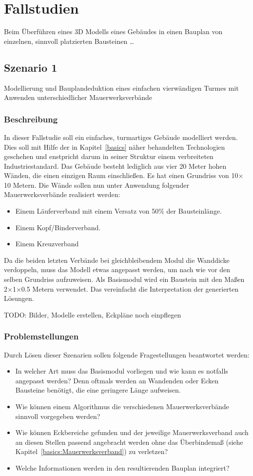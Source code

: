 \chapter{Fallstudien}\label{scenarios}
Beim Überführen eines 3D Modells eines Gebäudes in einen Bauplan von einzelnen, sinnvoll platzierten Bausteinen \dots
\section{Szenario 1}\label{scenarios:scenario1}
Modellierung und Bauplandeduktion eines einfachen vierwändigen Turmes mit Anwenden unterschiedlicher Mauerwerksverbände
\subsection*{Beschreibung}
In dieser Fallstudie soll ein einfaches, turmartiges Gebäude modelliert werden.
Dies soll mit Hilfe der in Kapitel~\ref{basics} näher behandelten Technologien geschehen und enstpricht darum in seiner Struktur einem verbreiteten Industriestandard.
Das Gebäude besteht lediglich aus vier 20 Meter hohen Wänden, die einen einzigen Raum einschließen.
Es hat einen Grundriss von 10$\times$10 Metern.
Die Wände sollen nun unter Anwendung folgender Mauerwerksverbände realisiert werden:
\begin{itemize}
  \item Einem Läuferverband mit einem Versatz von 50\% der Bausteinlänge.
  \item Einem Kopf/Binderverband.
  \item Einem Kreuzverband 
\end{itemize}
Da die beiden letzten Verbände bei gleichbleibendem Modul die Wanddicke verdoppeln, muss das Modell etwas angepasst werden, um nach wie vor den selben Grundriss aufzuweisen.
Als Basismodul wird ein Baustein mit den Maßen 2$\times$1$\times$0.5 Metern verwendet.
Das vereinfacht die Interpretation der generierten Lösungen.

TODO: Bilder, Modelle erstellen, Eckpläne noch einpflegen

\subsection*{Problemstellungen}
Durch Lösen dieser Szenarien sollen folgende Fragestellungen beantwortet werden:
\begin{itemize}
  \item In welcher Art muss das Basismodul vorliegen und wie kann es notfalls angepasst werden? 
  Denn oftmals werden an Wandenden oder Ecken Bausteine benötigt, die eine geringere Länge aufweisen.
  \item Wie können einem Algorithmus die verschiedenen Mauerwerksverbände sinnvoll vorgegeben werden?
  \item Wie können Eckbereiche gefunden und der jeweilige Mauerwerksverband auch an diesen Stellen passend angebracht werden ohne das Überbindemaß (siehe Kapitel~\ref{basics:Mauerwerksverband}) zu verletzen?
  \item Welche Informationen werden in den resultierenden Bauplan integriert?
\end{itemize}

